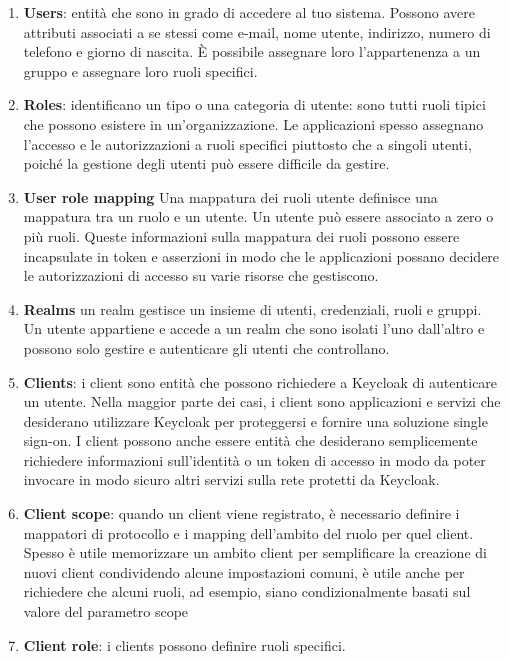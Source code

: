 \documentclass{article}
\begin{document}
\begin{enumerate}
    \item {\textbf{Users}: entità che sono in grado di accedere al tuo sistema. Possono avere attributi associati a se stessi come e-mail, nome utente, indirizzo, numero di telefono e giorno di nascita. È possibile assegnare loro l'appartenenza a un gruppo e assegnare loro ruoli specifici.}
    \item {\textbf{Roles}: identificano un tipo o una categoria di utente: sono tutti ruoli tipici che possono esistere in un'organizzazione. Le applicazioni spesso assegnano l'accesso e le autorizzazioni a ruoli specifici piuttosto che a singoli utenti, poiché la gestione degli utenti può essere difficile da gestire. }
    \item {\textbf{User role mapping} Una mappatura dei ruoli utente definisce una mappatura tra un ruolo e un utente. Un utente può essere associato a zero o più ruoli. Queste informazioni sulla mappatura dei ruoli possono essere incapsulate in token e asserzioni in modo che le applicazioni possano decidere le autorizzazioni di accesso su varie risorse che gestiscono.}
    \item {\textbf{Realms} un realm gestisce un insieme di utenti, credenziali, ruoli e gruppi. Un utente appartiene e accede a un realm che sono isolati l'uno dall'altro e possono solo gestire e autenticare gli utenti che controllano.}
    \item {\textbf{Clients}: i client sono entità che possono richiedere a Keycloak di autenticare un utente. Nella maggior parte dei casi, i client sono applicazioni e servizi che desiderano utilizzare Keycloak per proteggersi e fornire una soluzione single sign-on. I client possono anche essere entità che desiderano semplicemente richiedere informazioni sull'identità o un token di accesso in modo da poter invocare in modo sicuro altri servizi sulla rete protetti da Keycloak.}
    \item {\textbf{Client scope}: quando un client viene registrato, è necessario definire i mappatori di protocollo e i mapping dell'ambito del ruolo per quel client. Spesso è utile memorizzare un ambito client per semplificare la creazione di nuovi client condividendo alcune impostazioni comuni, è utile anche per richiedere che alcuni ruoli, ad esempio, siano condizionalmente basati sul valore del parametro scope}
    \item {\textbf{Client role}: i clients possono definire ruoli specifici.}
\end{enumerate}
\end{document}

